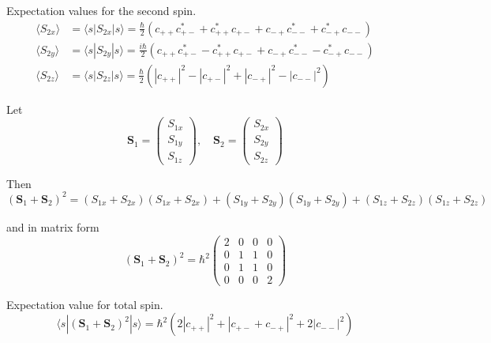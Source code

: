 Expectation values for the second spin.
\begin{align*}
\langle S_{2x}\rangle&=\langle s|S_{2x}|s\rangle
=\tfrac{\hbar}{2}
\left(c_{++}c_{+-}^*+c_{++}^*c_{+-}+c_{-+}c_{--}^*+c_{-+}^*c_{--}\right)
\\
\langle S_{2y}\rangle&=\langle s|S_{2y}|s\rangle
=\tfrac{i\hbar}{2}
\left(c_{++}c_{+-}^*-c_{++}^*c_{+-}+c_{-+}c_{--}^*-c_{-+}^*c_{--}\right)
\\
\langle S_{2z}\rangle&=\langle s|S_{2z}|s\rangle
=\tfrac{\hbar}{2}\left(|c_{++}|^2-|c_{+-}|^2+|c_{-+}|^2-|c_{--}|^2\right)
\end{align*}

Let
\begin{equation*}
\mathbf S_1=\begin{pmatrix}S_{1x}\\S_{1y}\\S_{1z}\end{pmatrix},\quad
\mathbf S_2=\begin{pmatrix}S_{2x}\\S_{2y}\\S_{2z}\end{pmatrix}
\end{equation*}

Then
\begin{equation*}
(\mathbf S_1+\mathbf S_2)^2
=(S_{1x}+S_{2x})(S_{1x}+S_{2x})+(S_{1y}+S_{2y})(S_{1y}+S_{2y})+(S_{1z}+S_{2z})(S_{1z}+S_{2z})
\end{equation*}

and in matrix form
\begin{equation*}
(\mathbf S_1+\mathbf S_2)^2=\hbar^2
\begin{pmatrix}
2&0&0&0\\
0&1&1&0\\
0&1&1&0\\
0&0&0&2
\end{pmatrix}
\end{equation*}

Expectation value for total spin.
\begin{equation*}
\langle s|(\mathbf S_1+\mathbf S_2)^2|s\rangle
=\hbar^2\left(2|c_{++}|^2+|c_{+-}+c_{-+}|^2+2|c_{--}|^2\right)
\end{equation*}

\newpage
{}


